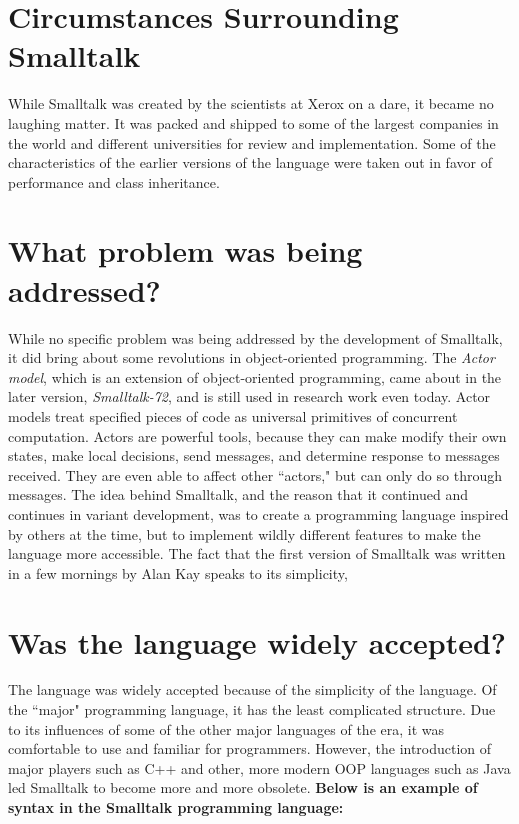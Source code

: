 \documentclass{article}
\begin{document}
\section*{Circumstances Surrounding Smalltalk}
While Smalltalk was created by the scientists at Xerox on a dare, it became no laughing matter. It was packed and shipped to some of the largest companies in the world and different universities for review and implementation. Some of the characteristics of the earlier versions of the language were taken out in favor of performance and class inheritance.

\section*{What problem was being addressed?}
While no specific problem was being addressed by the development of Smalltalk, it did bring about some revolutions in object-oriented programming. The \textit{Actor model}, which is an extension of object-oriented programming, came about in the later version, \textit{Smalltalk-72}, and is still used in research work even today. Actor models treat specified pieces of code as universal primitives of concurrent computation. Actors are powerful tools, because they can make modify their own states, make local decisions, send messages, and determine response to messages received. They are even able to affect other ``actors," but can only do so through messages.
\newline
The idea behind Smalltalk, and the reason that it continued and continues in variant development, was to create a programming language inspired by others at the time, but to implement wildly different features to make the language more accessible. The fact that the first version of Smalltalk was written in a few mornings by Alan Kay speaks to its simplicity, 

\section*{Was the language widely accepted?}
The language was widely accepted because of the simplicity of the language. Of the ``major" programming language, it has the least complicated structure. Due to its influences of some of the other major languages of the era, it was comfortable to use and familiar for programmers. However, the introduction of major players such as C++ and other, more modern OOP languages such as Java led Smalltalk to become more and more obsolete.
\newline 
\textbf{Below is an example of syntax in the Smalltalk programming language:}
\end{document}
